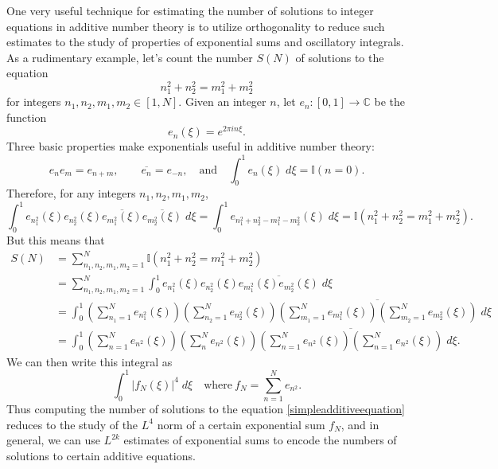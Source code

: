 \documentclass[12pt]{article}
\newcommand{\C}{\mathbb{C}}
\theoremstyle{definition}
\theoremstyle{remark}
\numberwithin{equation}{section}
\begin{document}
	One very useful technique for estimating the number of solutions to integer equations in additive number theory is to utilize orthogonality to reduce such estimates to the study of properties of exponential sums and oscillatory integrals. As a rudimentary example, let's count the number $S(N)$ of solutions to the equation
	\begin{equation} \label{simpleadditiveequation}
		n_1^2 + n_2^2 = m_1^2 + m_2^2
	\end{equation}
	for integers $n_1,n_2,m_1,m_2 \in [1,N]$. Given an integer $n$, let $e_n: [0,1] \to \C$ be the function
	\[ e_n(\xi) = e^{2 \pi i n \xi}. \]
	Three basic properties make exponentials useful in additive number theory:
	\[ e_n e_m = e_{n+m}, \quad\quad \overline{e_n} = e_{-n}, \quad\text{and}\quad \int_0^1 e_n(\xi)\; d\xi = \mathbb{I}(n = 0). \]
	Therefore, for any integers $n_1,n_2,m_1,m_2$,
	\[ \int_0^1 e_{n_1^2}(\xi) e_{n_2^2}(\xi) \overline{e_{m_1^2}(\xi)} \overline{e_{m_2^2}(\xi)}\; d\xi = \int_0^1 e_{n_1^2 + n_2^2 - m_1^2 - m_2^2}(\xi)\; d\xi = \mathbb{I}(n_1^2 + n_2^2 = m_1^2 + m_2^2).  \]
	But this means that
	\begin{align*}
		S(N) &= \sum_{n_1,n_2,m_1,m_2 = 1}^N \mathbb{I}(n_1^2 + n_2^2 = m_1^2 + m_2^2)\\
		&= \sum_{n_1,n_2,m_1,m_2 = 1}^N \int_0^1 e_{n_1^2}(\xi) e_{n_2^2}(\xi) \overline{e_{m_1^2}(\xi) e_{m_2^2}(\xi)}\; d\xi\\
		&= \int_0^1 \left( \sum_{n_1 = 1}^N e_{n_1^2}(\xi) \right) \left( \sum_{n_2 = 1}^N e_{n_2^2}(\xi) \right) \overline{\left( \sum_{m_1 = 1}^N e_{m_1^2}(\xi) \right) \left( \sum_{m_2 = 1}^N e_{m_2^2}(\xi) \right)}\; d\xi\\
		&= \int_0^1 \left( \sum_{n = 1}^N e_{n^2}(\xi) \right) \left( \sum_n^N e_{n^2}(\xi) \right) \overline{\left( \sum_{n = 1}^N e_{n^2}(\xi) \right) \left( \sum_{n = 1}^N e_{n^2}(\xi) \right)}\; d\xi.
	\end{align*}
	We can then write this integral as
	\[ \int_0^1 \left| f_N(\xi) \right|^4\; d\xi \quad\text{where}\ f_N = \sum_{n = 1}^N e_{n^2}. \]
    Thus computing the number of solutions to the equation \eqref{simpleadditiveequation} reduces to the study of the $L^4$ norm of a certain exponential sum $f_N$, and in general, we can use $L^{2k}$ estimates of exponential sums to encode the numbers of solutions to certain additive equations.
\end{document}
